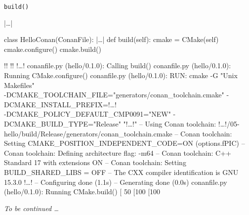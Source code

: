 \documentclass[compress, 8pt, aspectratio=169]{beamer}
\begin{document}
\begin{frame}[fragile]{\texttt{build()}}

  \begin{myinplacelisting}[minted language=python]
|\dots|

class HelloConan(ConanFile):
|\dots|
    def build(self):
        cmake = CMake(self)
        cmake.configure()
        cmake.build()
  \end{myinplacelisting}

  \bigbreak

  {\small
  \begin{terminalwindow}[!!][minted options={escapeinside=!!, lastline=10}]
!!
!!
!\dots!
conanfile.py (hello/0.1.0): Calling build()
conanfile.py (hello/0.1.0): Running CMake.configure()
conanfile.py (hello/0.1.0): RUN: cmake -G "Unix Makefiles"\\
-DCMAKE_TOOLCHAIN_FILE="generators/conan_toolchain.cmake"
-DCMAKE_INSTALL_PREFIX=!\dots!\\
-DCMAKE_POLICY_DEFAULT_CMP0091="NEW"
-DCMAKE_BUILD_TYPE="Release" "!\dots!"
-- Using Conan toolchain: !\dots!/05-hello/build/Release/generators/conan_toolchain.cmake
-- Conan toolchain: Setting CMAKE_POSITION_INDEPENDENT_CODE=ON (options.fPIC)
-- Conan toolchain: Defining architecture flag: -m64
-- Conan toolchain: C++ Standard 17 with extensions ON
-- Conan toolchain: Setting BUILD_SHARED_LIBS = OFF
-- The CXX compiler identification is GNU 15.3.0
!\dots!
-- Configuring done (1.1s)
-- Generating done (0.0s)
conanfile.py (hello/0.1.0): Running CMake.build()
[ 50%
[100%
[100%
  \end{terminalwindow}
  }

  \textit{To be continued \dots}

\end{frame}
\end{document}

